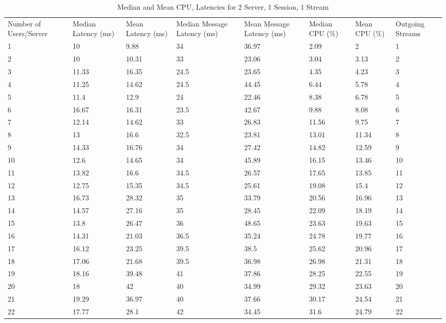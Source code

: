 \begin{table}
\caption{Median and Mean CPU, Latencies for 2 Server, 1 Session, 1 Stream}
\label{table:2serv_1sess_1str}
\begin{tabu} to\linewidth{|X[c]|X[c]|X[c]|X[c]|X[c]|X[c]|X[c]|X[c]|}
\everyrow{\hline}
\hline
Number of Users/Server & Median Latency (ms) & Mean Latency (ms) & Median Message Latency (ms) & Mean Message Latency (ms) & Median CPU (\%) & Mean CPU (\%) & Outgoing Streams\\
1 & 10 & 9.88 & 34 & 36.97 & 2.09 & 2 & 1 \\
2 & 10 & 10.31 & 33 & 23.06 & 3.04 & 3.13 & 2 \\
3 & 11.33 & 16.35 & 24.5 & 23.65 & 4.35 & 4.23 & 3 \\
4 & 11.25 & 14.62 & 24.5 & 44.45 & 6.44 & 5.78 & 4 \\
5 & 11.4 & 12.9 & 24 & 22.46 & 8.38 & 6.78 & 5 \\
6 & 16.67 & 16.31 & 23.5 & 42.67 & 9.88 & 8.08 & 6 \\
7 & 12.14 & 14.62 & 33 & 26.83 & 11.56 & 9.75 & 7 \\
8 & 13 & 16.6 & 32.5 & 23.81 & 13.01 & 11.34 & 8 \\
9 & 14.33 & 16.76 & 34 & 27.42 & 14.82 & 12.59 & 9 \\
10 & 12.6 & 14.65 & 34 & 45.89 & 16.15 & 13.46 & 10 \\
11 & 13.82 & 16.6 & 34.5 & 26.57 & 17.65 & 13.85 & 11 \\
12 & 12.75 & 15.35 & 34.5 & 25.61 & 19.08 & 15.4 & 12 \\
13 & 16.73 & 28.32 & 35 & 33.79 & 20.56 & 16.96 & 13 \\
14 & 14.57 & 27.16 & 35 & 28.45 & 22.09 & 18.19 & 14 \\
15 & 13.8 & 26.47 & 36 & 48.65 & 23.63 & 19.63 & 15 \\
16 & 14.31 & 21.03 & 36.5 & 35.24 & 24.78 & 19.77 & 16 \\
17 & 16.12 & 23.25 & 39.5 & 38.5 & 25.62 & 20.96 & 17 \\
18 & 17.06 & 21.68 & 39.5 & 36.98 & 26.98 & 21.31 & 18 \\
19 & 18.16 & 39.48 & 41 & 37.86 & 28.25 & 22.55 & 19 \\
20 & 18 & 42 & 40 & 34.99 & 29.32 & 23.63 & 20 \\
21 & 19.29 & 36.97 & 40 & 37.66 & 30.17 & 24.54 & 21 \\
22 & 17.77 & 28.1 & 42 & 34.45 & 31.6 & 24.79 & 22 \\

\end{tabu}
\end{table}
